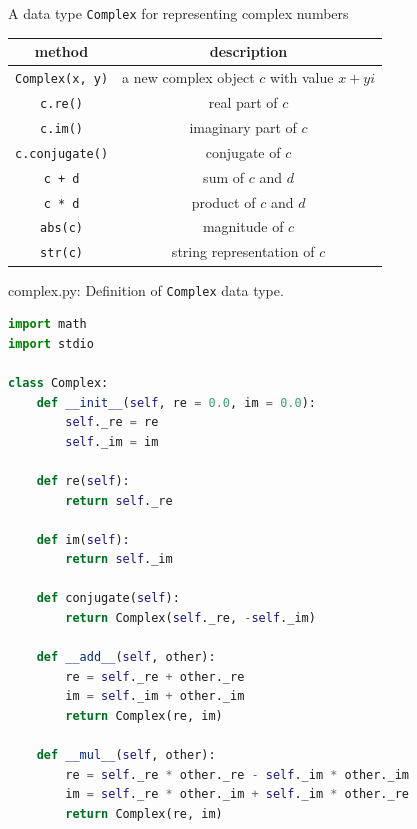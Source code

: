 \documentclass[8pt,a4paper,compress]{beamer}
\begin{document}
\begin{frame}[fragile]
A data type \lstinline{Complex} for representing complex numbers
\begin{center}
\begin{tabular}{cc}
method & description \\ \hline
\lstinline$Complex(x, y)$ & a new complex object $c$ with value $x + yi$ \\
\lstinline$c.re()$ & real part of $c$ \\
\lstinline$c.im()$ & imaginary part of $c$ \\
\lstinline$c.conjugate()$ & conjugate of $c$ \\
\lstinline$c + d$ & sum of $c$ and $d$ \\
\lstinline$c * d$ & product of $c$ and $d$ \\
\lstinline$abs(c)$ & magnitude of $c$ \\
\lstinline$str(c)$ & string representation of $c$
\end{tabular} 
\end{center}
\end{frame}

\begin{frame}[fragile]
\pause

\begin{framed}
\tiny complex.py: Definition of \lstinline{Complex} data type.
\end{framed}

\begin{lstlisting}[language=Python]
import math
import stdio

class Complex:
    def __init__(self, re = 0.0, im = 0.0):
        self._re = re
        self._im = im

    def re(self):
        return self._re

    def im(self):
        return self._im

    def conjugate(self):
        return Complex(self._re, -self._im)

    def __add__(self, other):
        re = self._re + other._re
        im = self._im + other._im
        return Complex(re, im)

    def __mul__(self, other):
        re = self._re * other._re - self._im * other._im
        im = self._re * other._im + self._im * other._re
        return Complex(re, im)
\end{lstlisting}
\end{frame}
\end{document}
